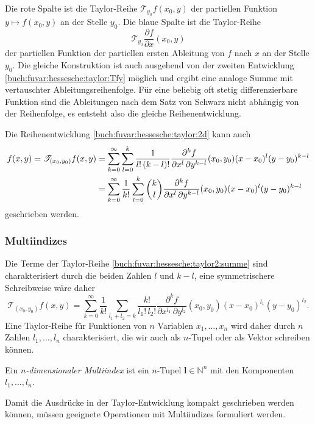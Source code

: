 Die rote Spalte ist die Taylor-Reihe $\mathscr{T}_{y_0} f(x_0,y)$ der
partiellen Funktion $y\mapsto f(x_0,y)$ an der Stelle $y_0$.
Die blaue Spalte ist die Taylor-Reihe
\[
\mathscr{T}_{y_0} \frac{\partial f}{\partial x}(x_0,y)
\]
der partiellen Funktion der partiellen ersten Ableitung von $f$ nach $x$
an der Stelle $y_0$.
Die gleiche Konstruktion ist auch ausgehend von der zweiten Entwicklung
\eqref{buch:fuvar:hessesche:taylor:Tfy} möglich und ergibt eine
analoge Summe mit vertauschter Ableitungsreihenfolge.
Für eine beliebig oft stetig differenzierbare Funktion sind die
Ableitungen nach dem Satz von Schwarz nicht abhängig von der Reihenfolge,
es entsteht also die gleiche Reihenentwicklung.

Die Reihenentwicklung \eqref{buch:fuvar:hessesche:taylor:2d} kann auch
\begin{align}
f(x,y)
=
\mathscr{T}_{(x_0,y_0)}f(x,y)
&=
\sum_{k=0}^\infty
\sum_{l=0}^k
\frac{1}{l!\,(k-l)!}
\frac{\partial^k f}{\partial x^l\,\partial y^{k-l}}(x_0,y_0)
(x-x_0)^l(y-y_0)^{k-l}
\notag
\\
&=
\sum_{k=0}^\infty
\frac{1}{k!}
\sum_{l=0}^k
\binom{k}{l}
\frac{\partial^k f}{\partial x^l\,\partial y^{k-l}}(x_0,y_0)
(x-x_0)^l(y-y_0)^{k-l}
\label{buch:fuvar:hessesche:taylor2:summe}
\end{align}
geschrieben werden.

%
%
%
\subsubsection{Multiindizes}
Die Terme der Taylor-Reihe \eqref{buch:fuvar:hessesche:taylor2:summe}
sind charakterisiert durch die beiden Zahlen $l$ und $k-l$, eine symmetrischere
Schreibweise wäre daher
\[
\mathscr{T}_{(x_0,y_0)}f(x,y)
=
\sum_{k=0}^\infty
\frac{1}{k!}
\sum_{l_1+l_2=k}
\frac{k!}{l_1!\,l_2!}
\frac{\partial^k f}{\partial x^{l_1}\,\partial y^{l_2}}(x_0,y_0)
(x-x_0)^{l_1}(y-y_0)^{l_2}.
\]
Eine Taylor-Reihe für Funktionen von $n$ Variablen $x_1,\dots,x_n$ wird
daher durch $n$ Zahlen $l_1,\dots,l_n$ charakterisiert, die wir auch
als $n$-Tupel oder als Vektor schreiben können.

\begin{definition}[Multiindex]
Ein {\em $n$-dimensionaler Multiindex} ist ein $n$-Tupel
$\mathbf{l}\in\mathbb{N}^n$ mit den Komponenten $l_1,\dots,l_n$.
\end{definition}

Damit die Ausdrücke in der Taylor-Entwicklung kompakt geschrieben werden 
können, müssen geeignete Operationen mit Multiindizes formuliert werden.

